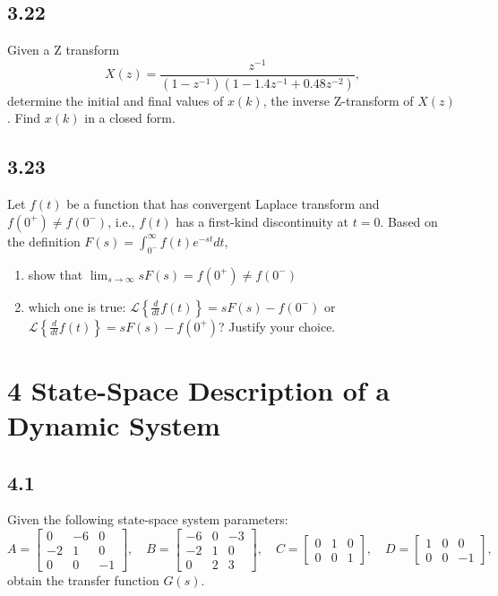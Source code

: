 \documentclass{article}
\newcommand{\problem}[2]{\subsection*{#1}}
\begin{document}
\problem{3.22}{}
Given a Z transform
\[
X(z) = \frac{z^{-1}}{(1 - z^{-1})(1 - 1.4z^{-1} + 0.48z^{-2})},
\]
determine the initial and final values of $x(k)$, the inverse Z-transform of $X(z)$. Find $x(k)$ in a closed form.

\problem{3.23}{}
Let $f(t)$ be a function that has convergent Laplace transform and $f(0^+) \neq f(0^-)$, i.e., $f(t)$ has a first-kind discontinuity at $t = 0$. Based on the definition $F(s) = \int_{0^-}^{\infty} f(t)e^{-st}dt$,
\begin{enumerate}
\item show that $\lim_{s \to \infty} sF(s) = f(0^+) \neq f(0^-)$
\item which one is true: $\mathcal{L}\left\{\frac{d}{dt}f(t)\right\} = sF(s) - f(0^-)$ or $\mathcal{L}\left\{\frac{d}{dt}f(t)\right\} = sF(s) - f(0^+)$? Justify your choice.
\end{enumerate}

\section*{4 State-Space Description of a Dynamic System}

\problem{4.1}{}
Given the following state-space system parameters:
\[
A = \begin{bmatrix} 0 & -6 & 0 \\ -2 & 1 & 0 \\ 0 & 0 & -1 \end{bmatrix}, \quad
B = \begin{bmatrix} -6 & 0 & -3 \\ -2 & 1 & 0 \\ 0 & 2 & 3 \end{bmatrix}, \quad
C = \begin{bmatrix} 0 & 1 & 0 \\ 0 & 0 & 1 \end{bmatrix}, \quad
D = \begin{bmatrix} 1 & 0 & 0 \\ 0 & 0 & -1 \end{bmatrix},
\]
obtain the transfer function $G(s)$.
\end{document}
